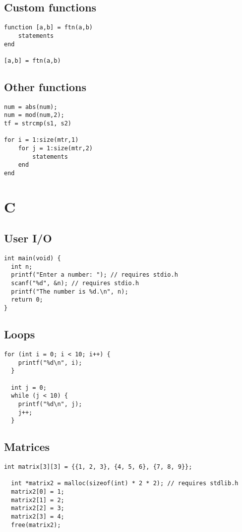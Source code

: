 \documentclass{article}
\begin{document}
\subsection{Custom functions}
\begin{lstlisting}[style=Matlab-editor]
function [a,b] = ftn(a,b)
    statements
end

[a,b] = ftn(a,b)
\end{lstlisting}

\subsection{Other functions}
\begin{lstlisting}[style=Matlab-editor]
num = abs(num);
num = mod(num,2);
tf = strcmp(s1, s2)

for i = 1:size(mtr,1)
    for j = 1:size(mtr,2)
        statements
    end
end
\end{lstlisting}
\pagebreak

\section{C}

\subsection{User I/O}
\begin{lstlisting}[style=CStyle]
int main(void) {
  int n;
  printf("Enter a number: "); // requires stdio.h
  scanf("%d", &n); // requires stdio.h
  printf("The number is %d.\n", n);
  return 0;
}
\end{lstlisting}

\subsection{Loops}
\begin{lstlisting}[style=CStyle]
  for (int i = 0; i < 10; i++) {
    printf("%d\n", i);
  }
  
  int j = 0;
  while (j < 10) {
    printf("%d\n", j);
    j++;
  }
\end{lstlisting}

\subsection{Matrices}
\begin{lstlisting}[style=CStyle]
  int matrix[3][3] = {{1, 2, 3}, {4, 5, 6}, {7, 8, 9}};
  
  int *matrix2 = malloc(sizeof(int) * 2 * 2); // requires stdlib.h
  matrix2[0] = 1;
  matrix2[1] = 2;
  matrix2[2] = 3;
  matrix2[3] = 4;
  free(matrix2);
\end{lstlisting}
\end{document}

